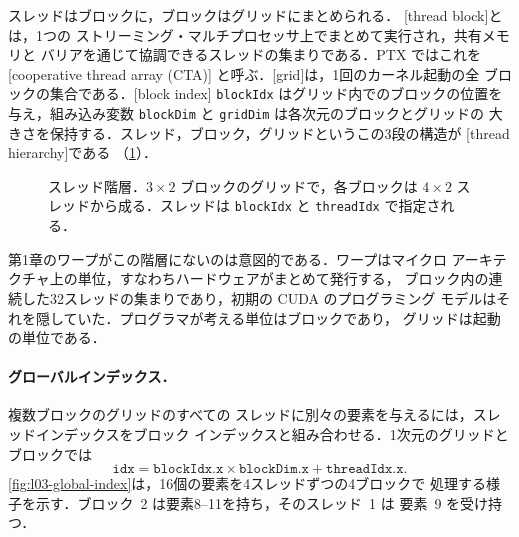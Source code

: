 \documentclass[../main.tex]{subfiles}
\begin{document}
\begin{definition}
  スレッドはブロックに，ブロックはグリッドにまとめられる．
  [thread block]とは，1つの
  ストリーミング・マルチプロセッサ上でまとめて実行され，共有メモリと
  バリアを通じて協調できるスレッドの集まりである．PTX ではこれを
  [cooperative thread array (CTA)]
  と呼ぶ．[grid]は，1回のカーネル起動の全
  ブロックの集合である．[block index]
  \texttt{blockIdx} はグリッド内でのブロックの位置を与え，組み込み変数
  \texttt{blockDim} と \texttt{gridDim} は各次元のブロックとグリッドの
  大きさを保持する．スレッド，ブロック，グリッドというこの3段の構造が
  [thread hierarchy]である
  （\cref{fig:l03-thread-hierarchy}）．
\end{definition}

\begin{figure}[tb]
  \centering
  
  \caption{スレッド階層．$3\times2$ ブロックのグリッドで，各ブロックは
    $4\times2$ スレッドから成る．スレッドは \texttt{blockIdx} と
    \texttt{threadIdx} で指定される．}
  \label{fig:l03-thread-hierarchy}
\end{figure}

第1章のワープがこの階層にないのは意図的である．ワープはマイクロ
アーキテクチャ上の単位，すなわちハードウェアがまとめて発行する，
ブロック内の連続した32スレッドの集まりであり，初期の CUDA のプログラミング
モデルはそれを隠していた．プログラマが考える単位はブロックであり，
グリッドは起動の単位である．

\paragraph{グローバルインデックス．}複数ブロックのグリッドのすべての
スレッドに別々の要素を与えるには，スレッドインデックスをブロック
インデックスと組み合わせる．1次元のグリッドとブロックでは
\begin{equation}
  \texttt{idx} = \texttt{blockIdx.x} \times \texttt{blockDim.x} +
  \texttt{threadIdx.x}.
  \label{eq:l03-global-index}
\end{equation}
\cref{fig:l03-global-index}は，16個の要素を4スレッドずつの4ブロックで
処理する様子を示す．ブロック~2 は要素8--11を持ち，そのスレッド~1 は
要素~9 を受け持つ．
\end{document}

